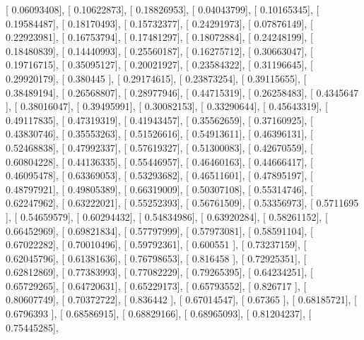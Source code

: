 \documentclass{article}
\begin{document}
       [ 0.06093408],
       [ 0.10622873],
       [ 0.18826953],
       [ 0.04043799],
       [ 0.10165345],
       [ 0.19584487],
       [ 0.18170493],
       [ 0.15732377],
       [ 0.24291973],
       [ 0.07876149],
       [ 0.22923981],
       [ 0.16753794],
       [ 0.17481297],
       [ 0.18072884],
       [ 0.24248199],
       [ 0.18480839],
       [ 0.14440993],
       [ 0.25560187],
       [ 0.16275712],
       [ 0.30663047],
       [ 0.19716715],
       [ 0.35095127],
       [ 0.20021927],
       [ 0.23584322],
       [ 0.31196645],
       [ 0.29920179],
       [ 0.380445  ],
       [ 0.29174615],
       [ 0.23873254],
       [ 0.39115655],
       [ 0.38489194],
       [ 0.26568807],
       [ 0.28977946],
       [ 0.44715319],
       [ 0.26258483],
       [ 0.4345647 ],
       [ 0.38016047],
       [ 0.39495991],
       [ 0.30082153],
       [ 0.33290644],
       [ 0.45643319],
       [ 0.49117835],
       [ 0.47319319],
       [ 0.41943457],
       [ 0.35562659],
       [ 0.37160925],
       [ 0.43830746],
       [ 0.35553263],
       [ 0.51526616],
       [ 0.54913611],
       [ 0.46396131],
       [ 0.52468838],
       [ 0.47992337],
       [ 0.57619327],
       [ 0.51300083],
       [ 0.42670559],
       [ 0.60804228],
       [ 0.44136335],
       [ 0.55446957],
       [ 0.46460163],
       [ 0.44666417],
       [ 0.46095478],
       [ 0.63369053],
       [ 0.53293682],
       [ 0.46511601],
       [ 0.47895197],
       [ 0.48797921],
       [ 0.49805389],
       [ 0.66319009],
       [ 0.50307108],
       [ 0.55314746],
       [ 0.62247962],
       [ 0.63222021],
       [ 0.55252393],
       [ 0.56761509],
       [ 0.53356973],
       [ 0.5711695 ],
       [ 0.54659579],
       [ 0.60294432],
       [ 0.54834986],
       [ 0.63920284],
       [ 0.58261152],
       [ 0.66452969],
       [ 0.69821834],
       [ 0.57797999],
       [ 0.57973081],
       [ 0.58591104],
       [ 0.67022282],
       [ 0.70010496],
       [ 0.59792361],
       [ 0.600551  ],
       [ 0.73237159],
       [ 0.62045796],
       [ 0.61381636],
       [ 0.76798653],
       [ 0.816458  ],
       [ 0.72925351],
       [ 0.62812869],
       [ 0.77383993],
       [ 0.77082229],
       [ 0.79265395],
       [ 0.64234251],
       [ 0.65729265],
       [ 0.64720631],
       [ 0.65229173],
       [ 0.65793552],
       [ 0.826717  ],
       [ 0.80607749],
       [ 0.70372722],
       [ 0.836442  ],
       [ 0.67014547],
       [ 0.67365   ],
       [ 0.68185721],
       [ 0.6796393 ],
       [ 0.68586915],
       [ 0.68829166],
       [ 0.68965093],
       [ 0.81204237],
       [ 0.75445285],
\end{document}

